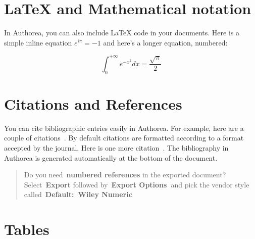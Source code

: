 \documentclass[alpha-refs]{wiley-article}
\begin{document}
\section*{LaTeX and Mathematical notation}
\label{sec:latex}
In Authorea, you can also include LaTeX code in your documents. Here is a simple inline equation $e^{i\pi}=-1$ and here's a longer equation, numbered:

\begin{equation}
\label{eqn:some}
\int_0^{+\infty}e^{-x^2}dx=\frac{\sqrt{\pi}}{2}
\end{equation}

\par\null

\section*{Citations and References}

{\label{203892}}

You can cite bibliographic entries easily in Authorea. For example, here
are a couple of citations~\cite{Cavalleri_2016,Gregory_2015}. By default citations are
formatted according to a format accepted by the journal. Here is one
more citation~\cite{Meskine_2019}. The bibliography in Authorea is
generated automatically at the bottom of the document.

\begin{quote}
Do you need~\textbf{numbered references} in the exported document?
Select~\textbf{Export} followed by~\textbf{Export Options~}and pick the
vendor style called~\textbf{Default:~Wiley Numeric}~
\end{quote}

\par\null

\section*{Tables}

{\label{336259}}
\end{document}
